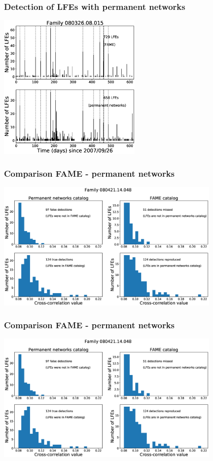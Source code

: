 \documentclass{beamer}
\begin{document}
	\begin{frame}
		\frametitle{Detection of LFEs with permanent networks}
		\begin{center}
			\includegraphics[width=7cm, trim={0cm 0cm 0cm 2cm}, clip]{catalog_SC/08032608015_permanent.eps}
		\end{center}
	\end{frame}

	\begin{frame}
		\frametitle{Comparison FAME - permanent networks}
		\begin{center}
			\includegraphics[width=11cm, trim={0cm 0cm 0cm 0cm}, clip]{catalog_SC/08042114048_comparison.eps}
		\end{center}
	\end{frame}

	\begin{frame}
		\frametitle{Comparison FAME - permanent networks}
		\begin{center}
			\includegraphics[width=11cm, trim={0cm 0cm 0cm 0cm}, clip]{catalog_SC/08042114048_comparison.eps}
		\end{center}
	\end{frame}
\end{document}
